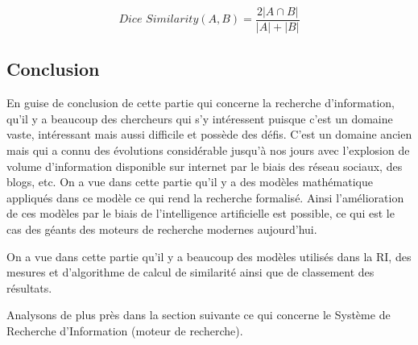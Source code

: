 \[
    \textit{Dice Similarity}(A, B) = \frac{2 |A \cap B|}{|A| + |B|}
\]

\subsection{Conclusion}
En guise de conclusion de cette partie qui concerne la recherche d'information, qu'il y a beaucoup des chercheurs qui s'y intéressent puisque c'est un domaine vaste, intéressant mais aussi difficile et possède des défis. C'est un domaine ancien mais qui a connu des évolutions considérable jusqu’à nos jours avec l'explosion de volume d'information disponible sur internet par le biais des réseau sociaux, des blogs, etc. On a vue dans cette partie qu'il y a des modèles mathématique appliqués dans ce modèle ce qui rend la recherche formalisé. Ainsi l'amélioration de ces modèles par le biais de l’intelligence artificielle est possible, ce qui est le cas des géants des moteurs de recherche modernes aujourd'hui.

On a vue dans cette partie qu'il y a beaucoup des modèles utilisés dans la RI, des mesures et d'algorithme de calcul de similarité ainsi que de classement des résultats.

Analysons de plus près dans la section suivante ce qui concerne le Système de Recherche d'Information (moteur de recherche).